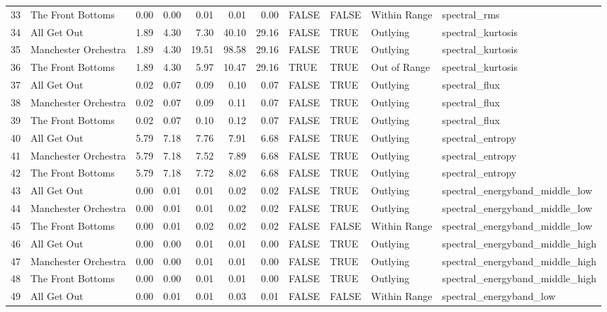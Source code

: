 \begin{table}[ht]
\begin{tabular}{rlrrrrrllll}
  33 & The Front Bottoms & 0.00 & 0.00 & 0.01 & 0.01 & 0.00 & FALSE & FALSE & Within Range & spectral\_rms \\ 
  34 & All Get Out & 1.89 & 4.30 & 7.30 & 40.10 & 29.16 & FALSE & TRUE & Outlying & spectral\_kurtosis \\ 
  35 & Manchester Orchestra & 1.89 & 4.30 & 19.51 & 98.58 & 29.16 & FALSE & TRUE & Outlying & spectral\_kurtosis \\ 
  36 & The Front Bottoms & 1.89 & 4.30 & 5.97 & 10.47 & 29.16 & TRUE & TRUE & Out of Range & spectral\_kurtosis \\ 
  37 & All Get Out & 0.02 & 0.07 & 0.09 & 0.10 & 0.07 & FALSE & TRUE & Outlying & spectral\_flux \\ 
  38 & Manchester Orchestra & 0.02 & 0.07 & 0.09 & 0.11 & 0.07 & FALSE & TRUE & Outlying & spectral\_flux \\ 
  39 & The Front Bottoms & 0.02 & 0.07 & 0.10 & 0.12 & 0.07 & FALSE & TRUE & Outlying & spectral\_flux \\ 
  40 & All Get Out & 5.79 & 7.18 & 7.76 & 7.91 & 6.68 & FALSE & TRUE & Outlying & spectral\_entropy \\ 
  41 & Manchester Orchestra & 5.79 & 7.18 & 7.52 & 7.89 & 6.68 & FALSE & TRUE & Outlying & spectral\_entropy \\ 
  42 & The Front Bottoms & 5.79 & 7.18 & 7.72 & 8.02 & 6.68 & FALSE & TRUE & Outlying & spectral\_entropy \\ 
  43 & All Get Out & 0.00 & 0.01 & 0.01 & 0.02 & 0.02 & FALSE & TRUE & Outlying & spectral\_energyband\_middle\_low \\ 
  44 & Manchester Orchestra & 0.00 & 0.01 & 0.01 & 0.02 & 0.02 & FALSE & TRUE & Outlying & spectral\_energyband\_middle\_low \\ 
  45 & The Front Bottoms & 0.00 & 0.01 & 0.02 & 0.02 & 0.02 & FALSE & FALSE & Within Range & spectral\_energyband\_middle\_low \\ 
  46 & All Get Out & 0.00 & 0.00 & 0.01 & 0.01 & 0.00 & FALSE & TRUE & Outlying & spectral\_energyband\_middle\_high \\ 
  47 & Manchester Orchestra & 0.00 & 0.00 & 0.01 & 0.01 & 0.00 & FALSE & TRUE & Outlying & spectral\_energyband\_middle\_high \\ 
  48 & The Front Bottoms & 0.00 & 0.00 & 0.01 & 0.01 & 0.00 & FALSE & TRUE & Outlying & spectral\_energyband\_middle\_high \\ 
  49 & All Get Out & 0.00 & 0.01 & 0.01 & 0.03 & 0.01 & FALSE & FALSE & Within Range & spectral\_energyband\_low \\ 

\end{tabular}
\end{table}
